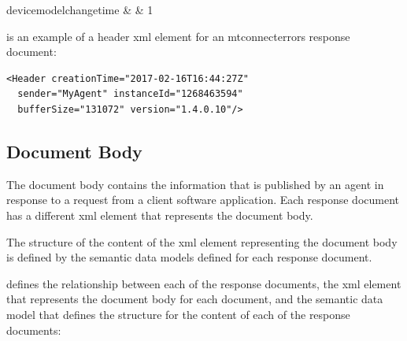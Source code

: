 \documentclass{mtconnect}	%
\providecommand{\DIFadd}[1]{{\hspace{0pt}\protect\color{blue}#1}} %
\providecommand{\DIFaddbegin}{} %
\providecommand{\DIFaddend}{} %
\begin{document}
\begin{longtabu}
\DIFaddbegin \DIFadd{\gls{devicemodelchangetime}
}&
\DIFadd{
}&
\DIFadd{1 }\\
\hline


\DIFaddend \end{longtabu}

 is an example of a \gls{header} \gls{xml} element for an \gls{mtconnecterrors response document}:

\begin{lstlisting}[firstnumber=1,escapechar=|,%
caption={Example of Header XML Element for MTConnectError}, label={lst:header-xml-element-for-mtconnecterror}]
<Header creationTime="2017-02-16T16:44:27Z" 
  sender="MyAgent" instanceId="1268463594"
  bufferSize="131072" version="1.4.0.10"/>
\end{lstlisting}

\subsection{Document Body}
\label{sec:Document Body}

The \gls{document body} contains the information that is published by an \gls{agent} in response to a \gls{request} from a client software application.  Each \gls{response document} has a different \gls{xml} element that represents the \gls{document body}.

The structure of the content of the \gls{xml} element representing the \gls{document body} is defined by the \glspl{semantic data model} defined for each \gls{response document}.

 defines the relationship between each of the \glspl{response document}, the \gls{xml} element that represents the \gls{document body} for each document, and the \gls{semantic data model} that defines the structure for the content of each of the \glspl{response document}:
\end{document}
